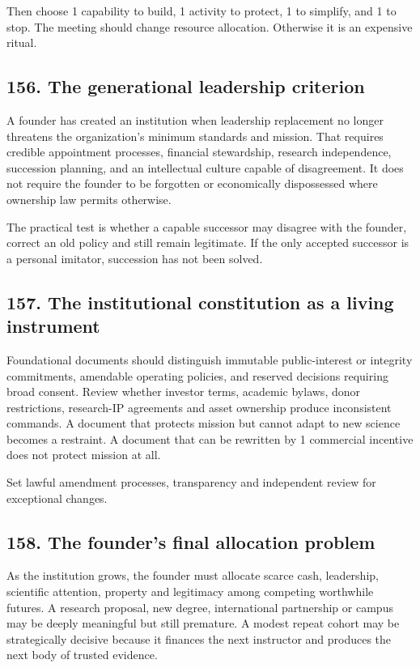 Then choose 1 capability to build, 1 activity to protect, 1 to simplify, and 1 to stop. The meeting should change resource allocation. Otherwise it is an expensive ritual.

\subsection{156. The generational leadership criterion}

A founder has created an institution when leadership replacement no longer threatens the organization's minimum standards and mission. That requires credible appointment processes, financial stewardship, research independence, succession planning, and an intellectual culture capable of disagreement. It does not require the founder to be forgotten or economically dispossessed where ownership law permits otherwise.

The practical test is whether a capable successor may disagree with the founder, correct an old policy and still remain legitimate. If the only accepted successor is a personal imitator, succession has not been solved.

\subsection{157. The institutional constitution as a living instrument}

Foundational documents should distinguish immutable public-interest or integrity commitments, amendable operating policies, and reserved decisions requiring broad consent. Review whether investor terms, academic bylaws, donor restrictions, research-IP agreements and asset ownership produce inconsistent commands. A document that protects mission but cannot adapt to new science becomes a restraint. A document that can be rewritten by 1 commercial incentive does not protect mission at all.

Set lawful amendment processes, transparency and independent review for exceptional changes.

\subsection{158. The founder's final allocation problem}

As the institution grows, the founder must allocate scarce cash, leadership, scientific attention, property and legitimacy among competing worthwhile futures. A research proposal, new degree, international partnership or campus may be deeply meaningful but still premature. A modest repeat cohort may be strategically decisive because it finances the next instructor and produces the next body of trusted evidence.

